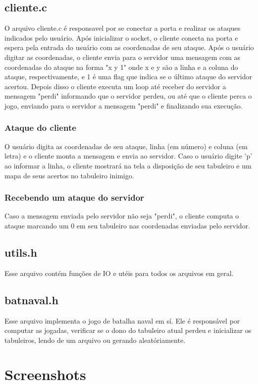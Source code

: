 \documentclass[11pt]{article}
\begin{document}
\subsection{cliente.c}
O arquivo cliente.c é responsavel por se conectar a porta e realizar os ataques indicados pelo usuário.
Após inicializar o socket, o cliente conecta na porta e espera pela entrada do usuário com as coordenadas de seu ataque.
Após o usuário digitar as coordenadas, o cliente envia para o servidor uma mensagem com as coordenadas do ataque na forma "x y 1" onde x e y são a linha e a coluna do ataque, respectivamente, e 1 é uma flag que indica se o último ataque do servidor acertou.
Depois disso o cliente executa um loop até receber do servidor a mensagem "perdi" informando que o servidor perdeu, ou até que o cliente perca o jogo, enviando para o servidor a mensagem "perdi" e finalizando sua execução.

\subsubsection{Ataque do cliente}
O usuário digita as coordenadas de seu ataque, linha (em número) e coluna (em letra) e o cliente monta a mensagem e envia ao servidor. Caso o usuário digite 'p' ao informar a linha, o cliente mostrará na tela a disposição de seu tabuleiro e um mapa de seus acertos no tabuleiro inimigo.

\subsubsection{Recebendo um ataque do servidor}
Caso a mensagem enviada pelo servidor não seja "perdi", o cliente computa o ataque marcando um 0 em seu tabuleiro nas coordenadas enviadas pelo servidor.

\subsection{utils.h}
Esse arquivo contém funções de IO e utéis para todos os arquivos em geral.

\subsection{batnaval.h}
Esse arquivo implementa o jogo de batalha naval em sí. Ele é responsável por computar as jogadas, verificar se o dono do tabuleiro atual perdeu e inicializar os tabuleiros, lendo de um arquivo ou gerando aleatóriamente.

\section{Screenshots}
\end{document}
